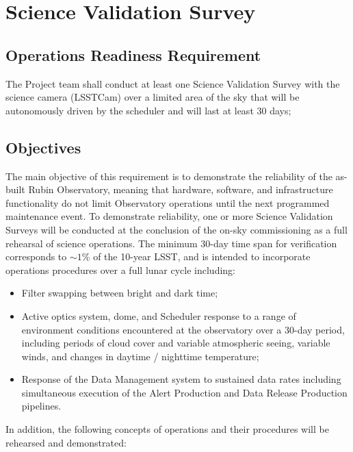 \section{Science Validation Survey}  \label{sec:svs}

\subsection{Operations Readiness Requirement}

The Project team shall conduct at least one Science Validation Survey with the science camera (LSSTCam) over a limited area of the sky that will be autonomously driven by the scheduler and will last at least 30 days;

\subsection{Objectives}

The main objective of this requirement is to demonstrate the reliability of the as-built Rubin Observatory, meaning that hardware, software, and infrastructure functionality do not limit Observatory operations until the next programmed maintenance event.
To demonstrate reliability, one or more Science Validation Surveys will be conducted at the conclusion of the on-sky commissioning as a full rehearsal of science operations. The minimum 30-day time span for verification corresponds to $\sim 1\%$ of the 10-year LSST, and is intended to incorporate operations procedures over a full lunar cycle including:

\begin{itemize}
\item Filter swapping between bright and dark time;
\item Active optics system, dome, and Scheduler response to a range of environment conditions encountered at the observatory over a 30-day period, including periods of cloud cover and variable atmospheric seeing, variable winds, and changes in daytime / nighttime temperature;
\item Response of the Data Management system to sustained data rates including simultaneous execution of the Alert Production and Data Release Production pipelines.
\end{itemize}

In addition, the following concepts of operations and their procedures will be rehearsed and demonstrated:

